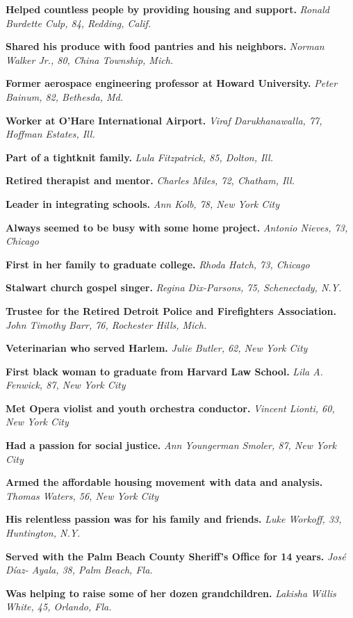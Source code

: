\textbf{Helped countless people by providing housing and support.}
\emph{Ronald Burdette Culp, 84, Redding, Calif.}

\textbf{Shared his produce with food pantries and his neighbors.}
\emph{Norman Walker Jr., 80, China Township, Mich.}

\textbf{Former aerospace engineering professor at Howard University.}
\emph{Peter Bainum, 82, Bethesda, Md.}

\textbf{Worker at O'Hare International Airport.} \emph{Viraf
Darukhanawalla, 77, Hoffman Estates, Ill.}

\textbf{Part of a tightknit family.} \emph{Lula Fitzpatrick, 85, Dolton,
Ill.}

\textbf{Retired therapist and mentor.} \emph{Charles Miles, 72, Chatham,
Ill.}

\textbf{Leader in integrating schools.} \emph{Ann Kolb, 78, New York
City}

\textbf{Always seemed to be busy with some home project.} \emph{Antonio
Nieves, 73, Chicago}

\textbf{First in her family to graduate college.} \emph{Rhoda Hatch, 73,
Chicago}

\textbf{Stalwart church gospel singer.} \emph{Regina Dix-Parsons, 75,
Schenectady, N.Y.}

\textbf{Trustee for the Retired Detroit Police and Firefighters
Association.} \emph{John Timothy Barr, 76, Rochester Hills, Mich.}

\textbf{Veterinarian who served Harlem.} \emph{Julie Butler, 62, New
York City}

\textbf{First black woman to graduate from Harvard Law School.}
\emph{Lila A. Fenwick, 87, New York City}

\textbf{Met Opera violist and youth orchestra conductor.} \emph{Vincent
Lionti, 60, New York City}

\textbf{Had a passion for social justice.} \emph{Ann Youngerman Smoler,
87, New York City}

\textbf{Armed the affordable housing movement with data and analysis.}
\emph{Thomas Waters, 56, New York City}

\textbf{His relentless passion was for his family and friends.}
\emph{Luke Workoff, 33, Huntington, N.Y.}

\textbf{Served with the Palm Beach County Sheriff's Office for 14
years.} \emph{José Díaz- Ayala, 38, Palm Beach, Fla.}

\textbf{Was helping to raise some of her dozen grandchildren.}
\emph{Lakisha Willis White, 45, Orlando, Fla.}

